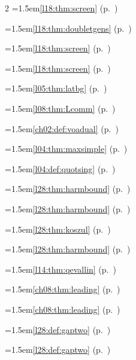 \begin{multicols}{2}
\hangindent=1.5em\quad \ref{l18:thm:screen} (p.~\pageref{l18:thm:screen})\par
\hangindent=1.5em\quad \ref{l18:thm:doubletgens} (p.~\pageref{l18:thm:doubletgens})\par
\hangindent=1.5em\quad \ref{l18:thm:screen} (p.~\pageref{l18:thm:screen})\par
\hangindent=1.5em\quad \ref{l18:thm:screen} (p.~\pageref{l18:thm:screen})\par
\hangindent=1.5em\quad \ref{l05:thm:latbg} (p.~\pageref{l05:thm:latbg})\par
\hangindent=1.5em\quad \ref{l08:thm:Lcomm} (p.~\pageref{l08:thm:Lcomm})\par
\hangindent=1.5em\quad \ref{ch02:def:voadual} (p.~\pageref{ch02:def:voadual})\par
\hangindent=1.5em\quad \ref{l04:thm:maxsimple} (p.~\pageref{l04:thm:maxsimple})\par
\hangindent=1.5em\quad \ref{l04:def:quotsing} (p.~\pageref{l04:def:quotsing})\par
\hangindent=1.5em\quad \ref{l28:thm:harmbound} (p.~\pageref{l28:thm:harmbound})\par
\hangindent=1.5em\quad \ref{l28:thm:harmbound} (p.~\pageref{l28:thm:harmbound})\par
\hangindent=1.5em\quad \ref{l28:thm:koszul} (p.~\pageref{l28:thm:koszul})\par
\hangindent=1.5em\quad \ref{l28:thm:harmbound} (p.~\pageref{l28:thm:harmbound})\par
\hangindent=1.5em\quad \ref{l14:thm:qevallin} (p.~\pageref{l14:thm:qevallin})\par
\hangindent=1.5em\quad \ref{ch08:thm:leading} (p.~\pageref{ch08:thm:leading})\par
\hangindent=1.5em\quad \ref{ch08:thm:leading} (p.~\pageref{ch08:thm:leading})\par
\hangindent=1.5em\quad \ref{l28:def:gaptwo} (p.~\pageref{l28:def:gaptwo})\par
\hangindent=1.5em\quad \ref{l28:def:gaptwo} (p.~\pageref{l28:def:gaptwo})\par

\end{multicols}
